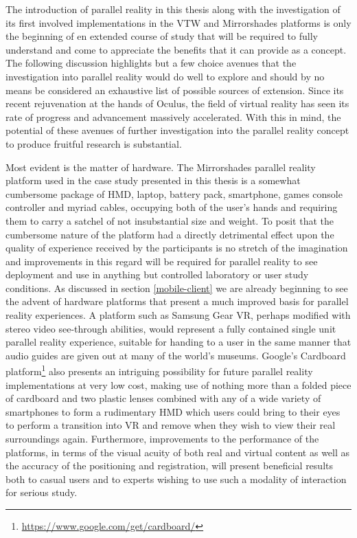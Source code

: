 The introduction of parallel reality in this thesis along with the investigation of its first involved implementations in the VTW and Mirrorshades platforms is only the beginning of en extended course of study that will be required to fully understand and come to appreciate the benefits that it can provide as a concept. The following discussion highlights but a few choice avenues that the investigation into parallel reality would do well to explore and should by no means be considered an exhaustive list of possible sources of extension. Since its recent rejuvenation at the hands of Oculus, the field of virtual reality has seen its rate of progress and advancement massively accelerated. With this in mind, the potential of these avenues of further investigation into the parallel reality concept to produce fruitful research is substantial.

Most evident is the matter of hardware. The Mirrorshades parallel reality platform used in the case study presented in this thesis is a somewhat cumbersome package of HMD, laptop, battery pack, smartphone, games console controller and myriad cables, occupying both of the user's hands and requiring them to carry a satchel of not insubstantial size and weight. To posit that the cumbersome nature of the platform had a directly detrimental effect upon the quality of experience received by the participants is no stretch of the imagination and improvements in this regard will be required for parallel reality to see deployment and use in anything but controlled laboratory or user study conditions. As discussed in section \ref{mobile-client} we are already beginning to see the advent of hardware platforms that present a much improved basis for parallel reality experiences. A platform such as Samsung Gear VR, perhaps modified with stereo video see-through abilities, would represent a fully contained single unit parallel reality experience, suitable for handing to a user in the same manner that audio guides are given out at many of the world's museums. Google's Cardboard platform\footnote{\url{https://www.google.com/get/cardboard/}} also presents an intriguing possibility for future parallel reality implementations at very low cost, making use of nothing more than a folded piece of cardboard and two plastic lenses combined with any of a wide variety of smartphones to form a rudimentary HMD which users could bring to their eyes to perform a transition into VR and remove when they wish to view their real surroundings again. Furthermore, improvements to the performance of the platforms, in terms of the visual acuity of both real and virtual content as well as the accuracy of the positioning and registration, will present beneficial results both to casual users and to experts wishing to use such a modality of interaction for serious study. 

